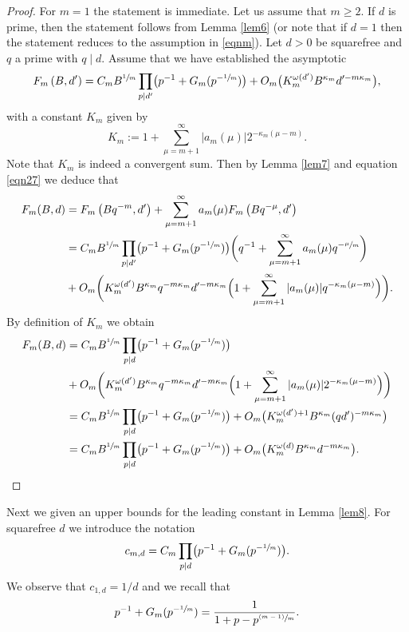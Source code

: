\documentclass[JEP,XML,SOM,Unicode,published]{cedram}
\newcommand{\psfrac}[2]{\sfrac{(#1)}{#2}}
\let\kap\kappa
\let\ome\omega
\theoremstyle{definition}
\numberwithin{theorem}{section}
\begin{document}
\begin{proof}
For $m=1$ the statement is immediate. Let us assume that $m\geq 2$.
If $d$ is prime, then the statement follows from Lemma \ref{lem6} (or note that if $d=1$ then the statement reduces to the assumption in \eqref{eqnm}). Let $d>0$ be squarefree and $q$ a prime with $q\mid d$. Assume that we have established the asymptotic
\[
F_m\left(B,d'\right)=C_mB^{\sfrac{1}{m}}\prod_{p\mid d'} \bigl(p^{-1}+G_m(p^{-\sfrac{1}{m}})\bigr)+ O_m\bigl(K_m^{\ome(d')}B^{\kap_m}d'^{-m\kap_m}\bigr),
\]
with a constant $K_m$ given by
\[
K_m:= 1+\sum_{\mu=m+1}^{\infty}|a_m(\mu)| 2^{-\kap_m(\mu-m)}.
\]
Note that $K_m$ is indeed a convergent sum. Then by Lemma \ref{lem7} and equation \eqref{eqn27} we deduce that
\begin{equation*}
\begin{split}
F_m(B,d)&= F_m\left(Bq^{-m},d'\right) +\sum_{\mu=m+1}^\infty a_m(\mu) F_m\left(Bq^{-\mu},d'\right)\\
&=C_mB^{\sfrac{1}{m}}\prod_{p\mid d'} \bigl(p^{-1}+G_m(p^{-\sfrac{1}{m}})\bigl)\biggl(q^{-1}+\sum_{\mu=m+1}^\infty a_m(\mu) q^{-\sfrac{\mu}{m}}\biggr)\\
&+ O_m\biggl(K_m^{\ome(d')}B^{\kap_m}q^{-m\kap_m}d'^{-m\kap_m}\Bigl(1+\sum_{\mu=m+1}^{\infty}|a_m(\mu)| q^{-\kap_m(\mu-m)}\Bigr)\biggr).
\end{split}
\end{equation*}
By definition of $K_m$ we obtain
\begin{equation*}
\begin{split}
F_m(B,d)&=C_mB^{\sfrac{1}{m}}\prod_{p\mid d} \bigl(p^{-1}+G_m(p^{-\sfrac{1}{m}})\bigr)\\ &+ O_m\biggl(K_m^{\ome(d')}B^{\kap_m}q^{-m\kap_m}d'^{-m\kap_m}\Bigl(1+\sum_{\mu=m+1}^{\infty}|a_m(\mu)| 2^{-\kap_m(\mu-m)}\Bigr)\biggr)\\
&=C_mB^{\sfrac{1}{m}}\prod_{p\mid d} \bigl(p^{-1}+G_m(p^{-\sfrac{1}{m}})\bigr)+ O_m\bigl(K_m^{\ome(d')+1}B^{\kap_m}(qd')^{-m\kap_m}\bigr)\\
&= C_mB^{\sfrac{1}{m}}\prod_{p\mid d} \bigl(p^{-1}+G_m(p^{-\sfrac{1}{m}})\bigr)+ O_m\bigl(K_m^{\ome(d)}B^{\kap_m}d^{-m\kap_m}\bigr).
\qedhere
\end{split}
\end{equation*}
\end{proof}

Next we given an upper bounds for the leading constant in Lemma \ref{lem8}. For squarefree $d$ we introduce the notation
\begin{equation}
\label{eq:c_md_explicit}
c_{m,d}=C_m\prod_{p\mid d}\bigl(p^{-1}+G_m(p^{-\sfrac{1}{m}})\bigr).
\end{equation}
We observe that $c_{1,d}=1/d$ and we recall that
\begin{equation}\label{eqn10}
p^{-1}+G_{m}(p^{-\sfrac{1}{m}})=\frac1{1+p-p^{\psfrac{m-1}{m}}}.
\end{equation}
\end{document}
